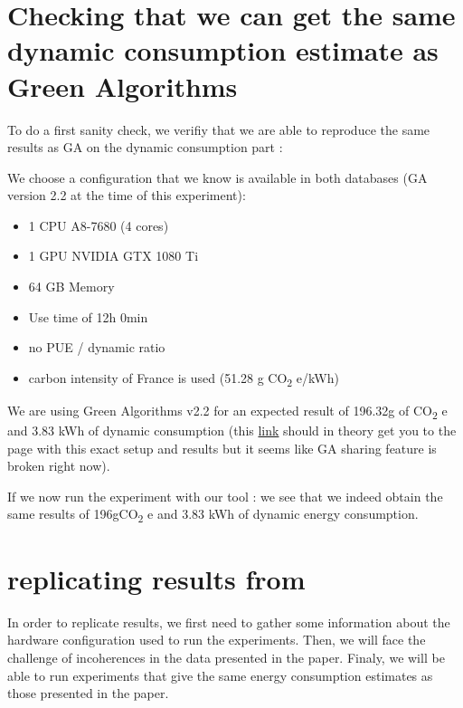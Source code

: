 \documentclass[11pt]{article}
\begin{document}
\section{Checking that we can get the same dynamic consumption estimate as Green Algorithms}
\label{sec:org3ee7866}

To do a first sanity check, we verifiy that we are able to reproduce
the same results as GA on the dynamic consumption part :

We choose a configuration that we know is available in both databases
(GA version 2.2 at the time of this experiment):
\begin{itemize}
\item 1 CPU A8-7680 (4 cores)
\item 1 GPU NVIDIA GTX 1080 Ti
\item 64 GB Memory

\item Use time of 12h 0min
\item no PUE / dynamic ratio
\item carbon intensity of France is used (51.28 g CO\textsubscript{2} e/kWh)
\end{itemize}

We are using Green Algorithms v2.2
for an expected result of 196.32g of CO\textsubscript{2} e and 3.83 kWh of dynamic
consumption (this \href{http://calculator.green-algorithms.org//?runTime\_hour=12\&runTime\_min=0\&appVersion=v2.2\&locationContinent=Europe\&locationCountry=France\&locationRegion=FR\&PUEradio=Yes\&PUE=1\&coreType=Both\&numberCPUs=4\&CPUmodel=A8-7680\&numberGPUs=1\&GPUmodel=NVIDIA\%20GTX\%201080\%20Ti\&memory=64\&platformType=localServer}{link} should in theory get you to the page with this
exact setup and results but it seems like GA sharing feature is broken right
now).

If we now run the experiment with our tool :
we see that we indeed obtain the same results of 196gCO\textsubscript{2} e and 3.83
kWh of dynamic energy consumption.

\section{replicating results from \cite{Bannour2021evaluating}}
\label{sec:orgcff86b2}
In order to replicate results, we first need to gather some
information about the hardware configuration used to run the
experiments. Then, we will face the challenge of incoherences in the
data presented in the paper. Finaly, we will be able to run
experiments that give the same energy consumption estimates as those
presented in the paper.
\end{document}
